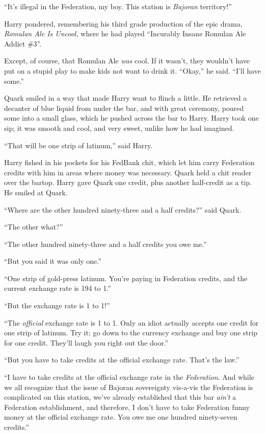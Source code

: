 \documentclass[twoside,letterpaper,12pt]{memoir}
\begin{document}
``It's illegal in the Federation, my boy. This station is \textit{Bajoran} territory!''

Harry pondered, remembering his third grade production of the epic drama, \textit{Romulan Ale Is Uncool}, where he had played ``Incurably Insane Romulan Ale Addict \#3''.

Except, of course, that Romulan Ale \textit{was} cool. If it wasn't, they wouldn't have put on a stupid play to make kids not want to drink it. ``Okay,'' he said. ``I'll have some.''

Quark smiled in a way that made Harry want to flinch a little. He retrieved a decanter of blue liquid from under the bar, and with great ceremony, poured some into a small glass, which he pushed across the bar to Harry. Harry took one sip; it was smooth and cool, and very sweet, unlike how he had imagined.

``That will be one strip of latinum,'' said Harry.

Harry fished in his pockets for his FedBank chit, which let him carry Federation credits with him in areas where money was necessary. Quark held a chit reader over the bartop. Harry gave Quark one credit, plus another half-credit as a tip. He smiled at Quark.

``Where are the other hundred ninety-three and a half credits?'' said Quark.

``The other what?''

``The other hundred ninety-three and a half credits you owe me.''

``But you said it was only one.''

``One strip of gold-press latinum. You're paying in Federation credits, and the current exchange rate is 194 to 1.''

``But the exchange rate is 1 to 1!''

``The \textit{official} exchange rate is 1 to 1. Only an idiot actually accepts one credit for one strip of latinum. Try it; go down to the currency exchange and buy one strip for one credit. They'll laugh you right out the door.''

``But you have to take credits at the official exchange rate. That's the law.''

``I have to take credits at the official exchange rate in the \textit{Federation}. And while we all recognize that the issue of Bajoran sovereignty vis-a-vis the Federation is complicated on this station, we've already established that this bar \textit{ain't} a Federation establishment, and therefore, I don't have to take Federation funny money at the official exchange rate. You owe me one hundred ninety-seven credits.''
\end{document}
